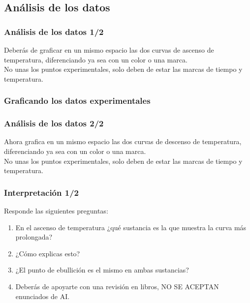 \documentclass[14pt]{beamer}
\begin{document}
\subsection{Análisis de los datos}

\begin{frame}
\frametitle{Análisis de los datos 1/2}
Deberás de graficar en un mismo espacio las dos curvas de ascenso de temperatura, diferenciando ya sea con un color o una marca.
\\
\bigskip
\pause
No unas los puntos experimentales, solo deben de estar las marcas de tiempo y temperatura.
\end{frame}
\begin{frame}
\frametitle{Graficando los datos experimentales}
\begin{figure}
    \centering
\end{figure}
\end{frame}
\begin{frame}
\frametitle{Análisis de los datos 2/2}
Ahora grafica en un mismo espacio las dos curvas de descenso de temperatura, diferenciando ya sea con un color o una marca.
\\
\bigskip
\pause
No unas los puntos experimentales, solo deben de estar las marcas de tiempo y temperatura.
\end{frame}
\begin{frame}
\frametitle{Interpretación 1/2}
Responde las siguientes preguntas:
\pause
{}
\begin{enumerate}[<+->]
\item En el ascenso de temperatura ¿qué sustancia es la que muestra la curva más prolongada?
\item ¿Cómo explicas esto?
\item ¿El punto de ebullición es el mismo en ambas sustancias?
\item Deberás de apoyarte con una revisión en libros, NO SE ACEPTAN enunciados de AI.
\end{enumerate}
\end{frame}
\end{document}
